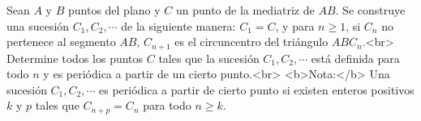 Sean $A$ y $B$ puntos del plano y $C$ un punto de la mediatriz de $AB$. Se construye una sucesión $C_1, C_2, \cdots$ de la siguiente manera: $C_1 = C$, y para $n \geq 1$, si $C_n$ no pertenece al segmento $AB$, $C_{n+1}$ es el circuncentro del triángulo $ABC_n$.<br>
Determine todos los puntos $C$ tales que la sucesión $C_1, C_2, \cdots$ está definida para todo $n$ y es periódica a partir de un cierto punto.<br>
<b>Nota:</b> Una sucesión $C_1, C_2, \cdots$ es periódica a partir de cierto punto si existen enteros positivos $k$ y $p$ tales que $C_{n+p} = C_n$ para todo $n \geq k$.
